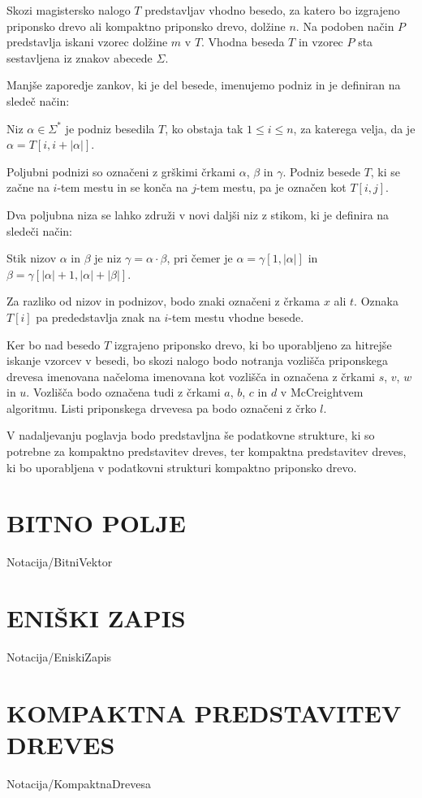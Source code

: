 Skozi magistersko nalogo $T$ predstavljav vhodno besedo, za katero bo izgrajeno priponsko drevo ali kompaktno priponsko drevo, dolžine $n$. Na podoben način $P$ predstavlja iskani vzorec dolžine $m$ v $T$. Vhodna beseda $T$ in vzorec $P$ sta sestavljena iz znakov abecede $\Sigma$.

Manjše zaporedje zankov, ki je del besede, imenujemo podniz in je definiran na sledeč način:
\begin{defi}
    Niz $\alpha\in\Sigma^*$ je podniz besedila $T$, ko obstaja tak $1\le i\le n$, za katerega velja, da je  $\alpha=T[i,i+|\alpha|]$. 
\end{defi}
Poljubni podnizi so označeni z grškimi črkami $\alpha$, $\beta$ in $\gamma$. Podniz besede $T$, ki se začne na $i$-tem mestu in se konča na $j$-tem mestu, pa je označen kot $T[i,j]$.

Dva poljubna niza se lahko združi v novi daljši niz z stikom, ki je definira na sledeči način:
\begin{defi}
    Stik nizov $\alpha$ in $\beta$ je niz $\gamma=\alpha\cdot\beta$, pri čemer je $\alpha=\gamma[1,|\alpha|]$ in $\beta=\gamma[|\alpha|+1,|\alpha|+|\beta|]$.
\end{defi}

Za razliko od nizov in podnizov, bodo znaki označeni z črkama $x$ ali $t$. Oznaka $T[i]$ pa prededstavlja znak na $i$-tem mestu vhodne besede.

Ker bo nad besedo $T$ izgrajeno priponsko drevo, ki bo uporabljeno za hitrejše iskanje vzorcev v besedi, bo skozi nalogo bodo notranja vozlišča priponskega drevesa imenovana načeloma imenovana kot vozlišča in označena z črkami $s$, $v$, $w$ in $u$. Vozlišča bodo označena tudi z črkami $a$, $b$, $c$ in $d$ v McCreightvem algoritmu. Listi priponskega drvevesa pa bodo označeni z črko $l$.

V nadaljevanju poglavja bodo predstavljna še podatkovne strukture, ki so potrebne za kompaktno predstavitev dreves, ter kompaktna predstavitev dreves, ki bo uporabljena v podatkovni strukturi kompaktno priponsko drevo.

\section{BITNO POLJE}\label{sec:Bitno_Polje}
{Notacija/BitniVektor}

\section{ENIŠKI ZAPIS}\label{sec:Eniski_Zapis}
{Notacija/EniskiZapis}

\section{KOMPAKTNA PREDSTAVITEV DREVES}\label{sec:kompaktna_drevesa}
{Notacija/KompaktnaDrevesa}
